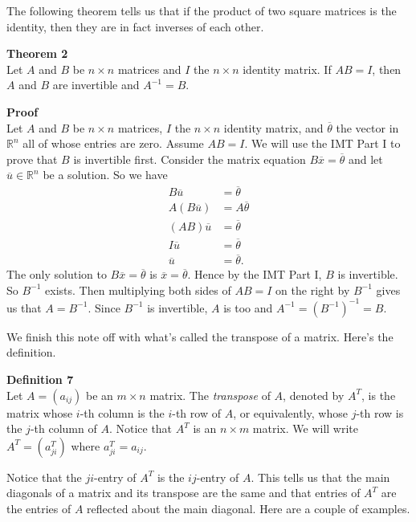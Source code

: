 \documentclass[12pt]{article}
\def\bar#1{\overline{#1}}
\def\th{\theta} \def\al{\alpha} \def\ba{\beta} \def\ga{\gamma}
\def\R{\mathbb{R}} \def\Q{\mathbb{Q}} \def\N{\mathbb{N}} \def\Z{\mathbb{Z}} \def\P{\mathbb{P}}
\begin{document}
The following theorem tells us that if the product of two square matrices is the identity, then they are in fact inverses of each other.

\begin{framed}
{\bf Theorem 2} \\
Let $A$ and $B$ be $n \times n$ matrices and $I$ the $n \times n$ identity matrix. If $AB = I$, then $A$ and $B$ are invertible and $A^{-1} = B$.
\end{framed}
{\bf Proof} \\
Let $A$ and $B$ be $n \times n$ matrices, $I$ the $n \times n$ identity matrix, and $\bar{\th}$ the vector in $\R^n$ all of whose entries are zero. Assume $AB = I$. We will use the IMT Part I to prove that $B$ is invertible first. Consider the matrix equation $B\bar{x} = \bar{\th}$ and let $\bar{u} \in \R^n$ be a solution. So we have 
\begin{align*}
B\bar{u} &= \bar{\th} \\
A(B\bar{u}) &= A\bar{\th} \\
(AB)\bar{u} &= \bar{\th} \\
I\bar{u} &= \bar{\th} \\
\bar{u} &= \bar{\th}.
\end{align*}
The only solution to $B\bar{x} = \bar{\th}$ is $\bar{x} = \bar{\th}$. Hence by the IMT Part I, $B$ is invertible. So $B^{-1}$ exists. Then multiplying both sides of $AB = I$ on the right by $B^{-1}$ gives us that $A = B^{-1}$. Since $B^{-1}$ is invertible, $A$ is too and $A^{-1} = (B^{-1})^{-1} = B$.

We finish this note off with what's called the transpose of a matrix. Here's the definition.

\begin{framed}
{\bf Definition 7} \\
Let $A = (a_{ij})$ be an $m \times n$ matrix. The {\itshape transpose} of $A$, denoted by $A^T$, is the matrix whose $i$-th column is the $i$-th row of $A$, or equivalently, whose $j$-th row is the $j$-th column of $A$. Notice that $A^T$ is an $n \times m$ matrix. We will write $A^T = (a^{T}_{ji})$ where $a^{T}_{ji} = a_{ij}$. 
\end{framed}
Notice that the $ji$-entry of $A^T$ is the $ij$-entry of $A$. 
This tells us that the main diagonals of a matrix and its transpose are the same and that entries of $A^T$ are the entries of $A$ reflected about the main diagonal. Here are a couple of examples.
\end{document}
